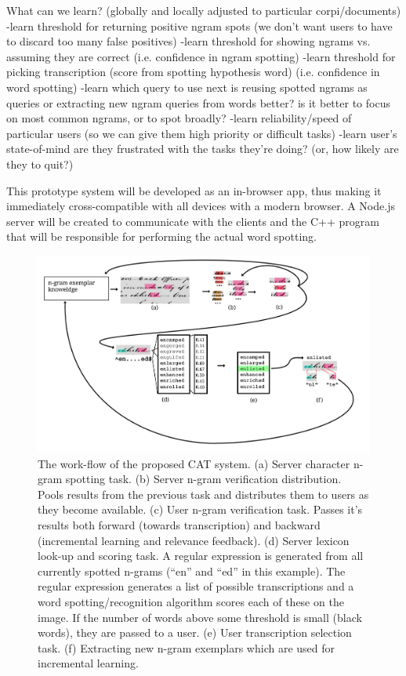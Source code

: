 \documentclass[ms]{byuprop}
\begin{document}
What can we learn? (globally and locally adjusted to particular corpi/documents)
-learn threshold for returning positive ngram spots (we don't want users to have to discard too many false positives)
-learn threshold for showing ngrams vs. assuming they are correct (i.e. confidence in ngram spotting)
-learn threshold for picking transcription (score from spotting hypothesis word) (i.e. confidence in word spotting)
-learn which query to use next
	is reusing spotted ngrams as queries or extracting new ngram queries from words better?
	is it better to focus on most common ngrams, or to spot broadly?
-learn reliability/speed of particular users (so we can give them high priority or difficult tasks)
-learn user's state-of-mind
	are they frustrated with the tasks they're doing? (or, how likely are they to quit?)
\fi	




This prototype system will be developed as an in-browser app, thus making it immediately cross-compatible with all devices with a modern browser. A Node.js server will be created to communicate with the clients and the C++ program that will be responsible for performing the actual word spotting.

\begin{figure}
    \centering
    \includegraphics[width=.95\textwidth]{flow6}
    \caption{The work-flow of the proposed CAT system. (a) Server character n-gram spotting task. (b) Server n-gram verification distribution. Pools results from the previous task and distributes them to users as they become available. (c) User n-gram verification task. Passes it's results both forward (towards transcription) and backward (incremental learning and relevance feedback). (d) Server lexicon look-up and scoring task. A regular expression is generated from all currently spotted n-grams (``en'' and ``ed'' in this example). The regular expression generates a list of possible transcriptions and a word spotting/recognition algorithm scores each of these on the image. If the number of words above some threshold is small (black words), they are passed to a user. (e) User transcription selection task. (f) Extracting new n-gram exemplars which are used for incremental learning.}
    \label{fig:system_diagram}
\end{figure}
\end{document}
